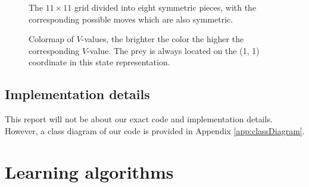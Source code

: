 \documentclass{article}
\begin{document}
\begin{figure}[htbp]
        \caption{\label{fig:statespaceSymm}The $11 \times 11$ grid divided into eight symmetric pieces, with the corresponding possible moves which are also symmetric.}

        \caption{\label{fig:NewStateRep} Colormap of $V$-values, the brighter the color the higher the corresponding $V$-value. The prey is always located on the (1, 1) coordinate in this state representation.}
\end{figure}


\subsection{Implementation details}
This report will not be about our exact code and implementation details. However, a class diagram of our code is provided in Appendix \ref{app:classDiagram}.

\section{Learning algorithms}
\end{document}
